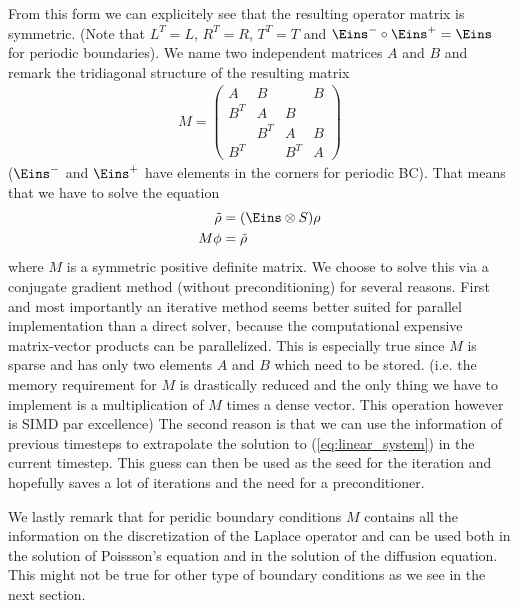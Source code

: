 \documentclass[a4paper,12pt]{scrartcl}
\begin{document}
From this form we can explicitely see that the resulting operator matrix is 
symmetric. (Note that $L^T = L$, $R^T = R$, $T^T = T$ and $\Eins^-\circ \Eins^+ = \Eins$ for
periodic boundaries). 
We name two independent matrices $A$ and $B$
and remark the tridiagonal structure of the resulting matrix
\begin{align}
   M =  \begin{pmatrix}
        A&B& &B \\
        B^T&A&B& \\
         &B^T&A&B\\
        B^T& &B^T&A
    \end{pmatrix} 
    \label{eq:operator_matrix_periodic}
\end{align}
($\Eins^-$ and $\Eins^+$ have elements in the corners for periodic BC).
That means that we have to solve the equation 
\begin{align}
    \tilde \rho &= (\Eins\otimes S )\rho \nonumber \\
    M \phi &=  \tilde \rho 
    \label{eq:linear_system}
\end{align}
where $M$ is a symmetric positive definite matrix. We choose to solve 
this via a conjugate gradient method (without preconditioning) for several reasons. 
First and most importantly  
an iterative method seems better suited for parallel implementation than a
direct solver, because the computational expensive matrix-vector products 
can be parallelized. 
This is especially true since $M$ is sparse and 
has only two elements $A$ and $B$ which need to be stored. (i.e. the memory
requirement for $M$ is drastically reduced and the only 
thing we have to implement is a multiplication of $M$ times a dense vector. 
This operation however is SIMD par excellence)
The second reason is that we can use the information of previous timesteps 
to extrapolate the solution to (\ref{eq:linear_system}) in the 
current timestep.
This guess can then be used as the seed for the iteration and hopefully 
saves a lot of iterations and the need for a preconditioner. 

We lastly remark that for peridic boundary conditions $M$ contains all 
the information on the discretization of the Laplace operator and can be used
both in the solution of Poissson's equation and in the solution of the 
diffusion equation. This might not be true for other type of boundary conditions
as we see in the next section.
\end{document}
